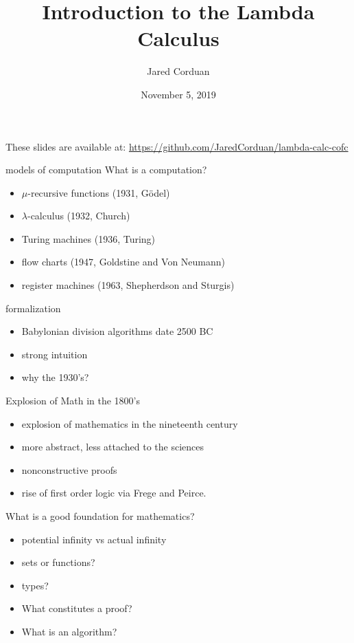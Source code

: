 \documentclass{beamer}
\title[Introduction to the Lambda Calculus]{Introduction to the Lambda Calculus}
\author[]{Jared Corduan}
\date{November 5, 2019}
\begin{document}
\begin{frame}
  \titlepage
\end{frame}

\begin{frame}
  These slides are available at:
  \url{https://github.com/JaredCorduan/lambda-calc-cofc}
\end{frame}

\begin{frame}{models of computation}
  What is a computation?

  \begin{itemize}
    \item $\mu$-recursive functions (1931, G\"odel)
    \item $\lambda$-calculus (1932, Church)
    \item Turing machines (1936, Turing)
    \item flow charts (1947, Goldstine and Von Neumann)
    \item register machines (1963, Shepherdson and Sturgis)
  \end{itemize}
\end{frame}

\begin{frame}{formalization}
  \begin{itemize}
    \item Babylonian division algorithms date 2500 BC
    \item strong intuition
    \item why the 1930's?
  \end{itemize}
\end{frame}

\begin{frame}{Explosion of Math in the 1800's}
  \begin{itemize}
    \item explosion of mathematics in the nineteenth century
    \item more abstract, less attached to the sciences
    \item nonconstructive proofs
    \item rise of first order logic via Frege and Peirce.
  \end{itemize}
\end{frame}

\begin{frame}{What is a good foundation for mathematics?}
  \begin{itemize}
    \item potential infinity vs actual infinity
    \item sets or functions?
    \item types?
    \item What constitutes a proof?
    \item What is an algorithm?
  \end{itemize}
\end{frame}
\end{document}

